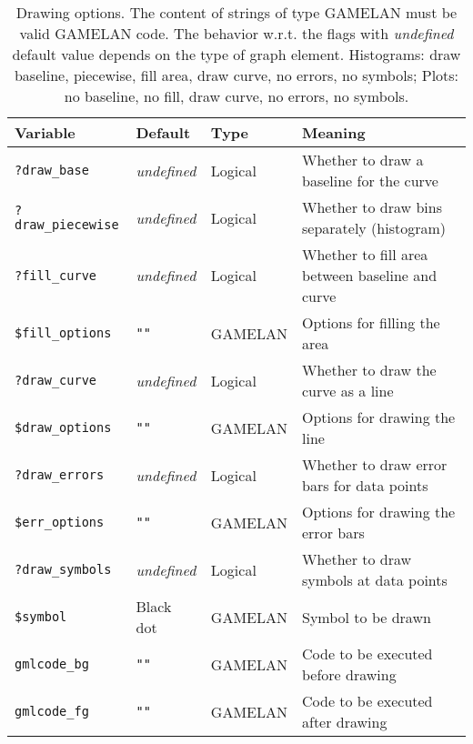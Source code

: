 \documentclass[12pt]{book}
\newcommand{\ttt}[1]{\texttt{#1}}
\begin{document}
\begin{table}
  \caption{Drawing options.  The content of strings of type GAMELAN must be
    valid GAMELAN code.  The behavior w.r.t. the flags with \emph{undefined}
    default value depends on the type of graph element.  Histograms: draw
    baseline, piecewise, fill area, draw curve, no errors, no symbols;  Plots:
    no baseline, no fill, draw curve, no errors, no symbols.} 
  \label{tab:drawing-options}

  \begin{center}
    \begin{tabular}{|l|l|l|l|}
      \hline
      Variable & Default & Type & Meaning
      \\
      \hline\hline
      \ttt{?draw\_base}  & \emph{undefined} & Logical &
        Whether to draw a baseline for the curve
      \\
      \hline
      \ttt{?draw\_piecewise}  & \emph{undefined} & Logical &
        Whether to draw bins separately (histogram)
      \\
      \hline
      \ttt{?fill\_curve}  & \emph{undefined} & Logical &
        Whether to fill area between baseline and curve
      \\
      \hline
      \ttt{\$fill\_options} & \ttt{""} & GAMELAN &
        Options for filling the area
      \\
      \hline
      \ttt{?draw\_curve} & \emph{undefined} & Logical &
        Whether to draw the curve as a line
      \\
      \hline
      \ttt{\$draw\_options} & \ttt{""} & GAMELAN &
        Options for drawing the line
      \\
      \hline
      \ttt{?draw\_errors} & \emph{undefined} & Logical &
        Whether to draw error bars for data points
      \\
      \hline
      \ttt{\$err\_options} & \ttt{""} & GAMELAN &
        Options for drawing the error bars
      \\
      \hline
      \ttt{?draw\_symbols} & \emph{undefined} & Logical &
        Whether to draw symbols at data points 
      \\
      \hline
      \ttt{\$symbol} & Black dot & GAMELAN &
        Symbol to be drawn
      \\
      \hline
      \ttt{gmlcode\_bg} & \ttt{""} & GAMELAN &
         Code to be executed before drawing
      \\
      \hline
      \ttt{gmlcode\_fg} & \ttt{""} & GAMELAN &
         Code to be executed after drawing
      \\
      \hline
    \end{tabular}
  \end{center}
\end{table}
\end{document}
